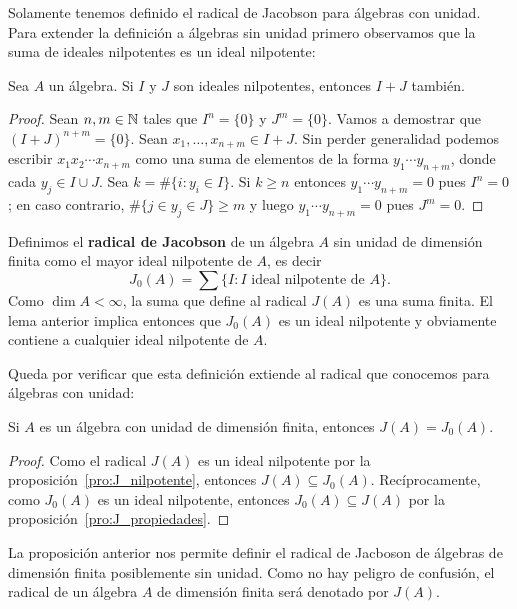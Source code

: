 Solamente tenemos definido el radical de Jacobson para álgebras con unidad. Para extender la definición a álgebras sin unidad
primero observamos que la suma de ideales nilpotentes es un ideal nilpotente:

\begin{lemma}
    Sea $A$ un álgebra. Si $I$ y $J$ son ideales nilpotentes, entonces $I+J$ también.
\end{lemma}

\begin{proof}
    Sean $n,m\in\mathbb{N}$ tales que $I^n=\{0\}$ y $J^m=\{0\}$. 
    Vamos a demostrar que $(I+J)^{n+m}=\{0\}$. Sean $x_1,\dots,x_{n+m}\in I+J$. Sin perder generalidad
    podemos escribir $x_1x_2\cdots x_{n+m}$ como una suma de elementos de la forma 
    $y_1\cdots y_{n+m}$, donde cada $y_j\in I\cup J$. Sea
	$k=\#\{i:y_i\in I\}$. Si $k\geq n$ entonces $y_1\cdots y_{n+m}=0$ pues $I^n=0$; en caso
	contrario, $\#\{j\in y_j\in J\}\geq m$ y luego $y_1\cdots y_{n+m}=0$ pues $J^m=0$.
\end{proof}

Definimos el \textbf{radical de Jacobson} de un álgebra $A$ sin unidad de dimensión finita
como el mayor ideal nilpotente de $A$, es decir 
\[
J_0(A)=\sum\{I:\text{$I$ ideal nilpotente de $A$}\}.
\]
Como $\dim A<\infty$, la suma que define al radical $J(A)$ es una suma finita. El lema anterior implica 
entonces que $J_0(A)$ es un ideal nilpotente y obviamente contiene a cualquier ideal nilpotente de $A$. 

Queda por verificar que esta definición extiende al radical que conocemos para álgebras con unidad:

\begin{proposition}
    Si $A$ es un álgebra con unidad de dimensión finita, entonces $J(A)=J_0(A)$. 
\end{proposition}

\begin{proof}
    Como el radical $J(A)$ es un ideal nilpotente por la proposición~\ref{pro:J_nilpotente}, entonces $J(A)\subseteq J_0(A)$. 
    Recíprocamente, como $J_0(A)$ es un ideal nilpotente, entonces
    $J_0(A)\subseteq J(A)$ por la proposición~\ref{pro:J_propiedades}. 
\end{proof}

La proposición anterior nos permite definir el radical de Jacboson 
de álgebras de dimensión finita posiblemente sin unidad. Como no hay peligro de confusión, el radical 
de un álgebra $A$ de dimensión finita será denotado por $J(A)$. 

